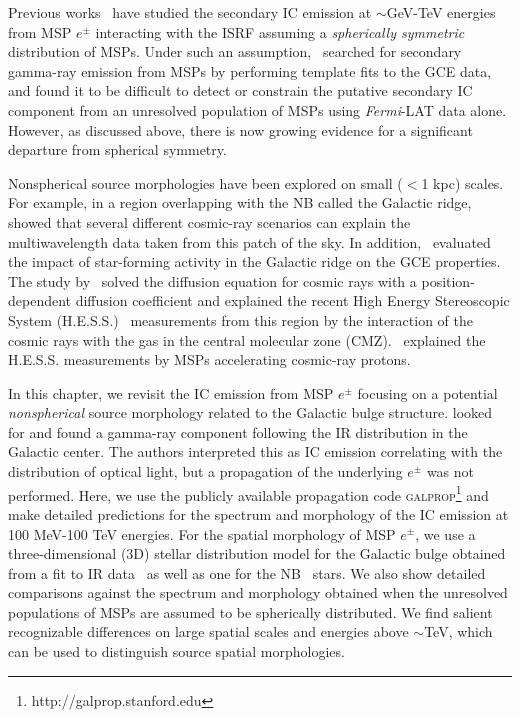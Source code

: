 \documentclass[doublespace,nopageskip]{VTthesis}
\begin{document}
Previous works~\cite{2015ApJ...802..124Y,2015JCAP...02..023P} have studied the secondary IC emission at $\sim$GeV-TeV energies from MSP $e^\pm$ interacting with the ISRF assuming a \emph{spherically symmetric} distribution of MSPs. Under such an assumption,~\citet{2016PhRvD..93j3004L} searched for secondary gamma-ray emission from MSPs by performing template fits to the GCE data, and found it to be difficult to detect or constrain the putative secondary IC component from an unresolved population of MSPs using \textit{Fermi}-LAT data alone. However, as discussed above, there is now growing evidence for a significant departure from spherical symmetry.

Nonspherical source morphologies have been explored on small ($<$1 kpc) scales. For example, in a region overlapping with the NB called the Galactic ridge,~\citet{2015MNRAS.451.1833M} showed that several different cosmic-ray scenarios can explain the multiwavelength data taken from this patch of the sky. In addition,~\citet{2016PhRvL.117k1101C} evaluated the impact of star-forming activity in the Galactic ridge on the GCE properties. The study by~\citet{2017PhRvL.119c1101G} solved the diffusion equation for cosmic rays with a position-dependent diffusion coefficient and explained the recent High Energy Stereoscopic System (H.E.S.S.)~\cite{2016Natur.531..476H} measurements from this region by the interaction of the cosmic rays with the gas in the central molecular zone (CMZ).~\citet{2018JCAP...07..042G} explained the H.E.S.S. measurements by MSPs accelerating cosmic-ray protons.

In this chapter, we revisit the IC emission from MSP $e^\pm$ focusing on a potential \emph{nonspherical} source morphology related to the Galactic bulge structure. \citet{2015JCAP...07..013A} looked for and found a gamma-ray component following the IR distribution in the Galactic center. The authors interpreted this as IC emission correlating with the distribution of optical light, but a propagation of the underlying $e^\pm$ was not performed. Here, we use the publicly available propagation code \textsc{galprop}\footnote{http://galprop.stanford.edu}\cite{2000ApJ...537..763S} and make detailed predictions for the spectrum and morphology of the IC emission at 100 MeV-100 TeV energies. For the spatial morphology of MSP $e^\pm$, we use a three-dimensional (3D) stellar distribution model for the Galactic bulge obtained from a fit to IR data~\cite{1998ApJ...492..495F} as well as one for the NB~\cite{2002A&A...384..112L} stars. We also show detailed comparisons against the spectrum and morphology obtained when the unresolved populations of MSPs are assumed to be spherically distributed. We find salient recognizable differences on large spatial scales and energies above $\sim$TeV, which can be used to distinguish source spatial morphologies.
\end{document}

